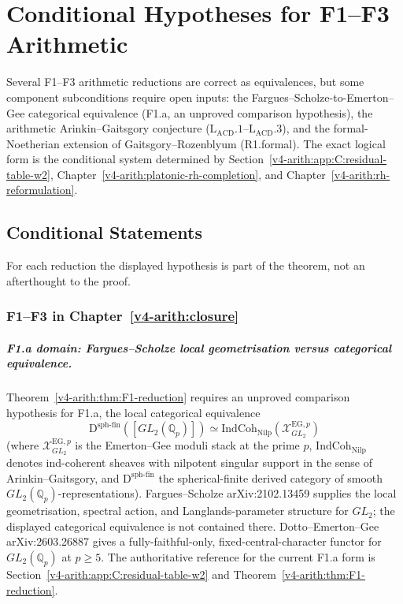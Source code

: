 \chapter{Conditional Hypotheses for F1--F3 Arithmetic}
\label{v4-arith:w3-comparison-A}

Several F1--F3 arithmetic reductions are correct as equivalences, but
some component subconditions require open inputs:
the Fargues--Scholze-to-Emerton--Gee categorical equivalence
(F1.a, an unproved comparison hypothesis), the arithmetic
Arinkin--Gaitsgory conjecture
(\(\mathrm{L}_{\mathrm{ACD}}.1\)--\(\mathrm{L}_{\mathrm{ACD}}.3\)),
and the formal-Noetherian extension of Gaitsgory--Rozenblyum
(R1.formal). The exact logical form is the conditional system
determined by
Section~\ref{v4-arith:app:C:residual-table-w2},
Chapter~\ref{v4-arith:platonic-rh-completion}, and
Chapter~\ref{v4-arith:rh-reformulation}.

\section{Conditional Statements}
\label{v4-arith:w3-comparison-A:list}

For each reduction the displayed hypothesis is part of the theorem, not
an afterthought to the proof.

\subsection{F1--F3 in Chapter~\ref{v4-arith:closure}}
\label{v4-arith:w3-comparison-A:ch22}

\paragraph{F1.a domain: Fargues--Scholze local geometrisation versus categorical equivalence.}
Theorem~\ref{v4-arith:thm:F1-reduction} requires
an unproved comparison hypothesis for F1.a, the local categorical
equivalence
\[
\mathrm{D}^{\mathrm{sph\text{-}fin}}([GL_{2}(\mathbb{Q}_{p})])
\simeq
\mathrm{IndCoh}_{\mathrm{Nilp}}(\mathcal{X}^{\mathrm{EG},p}_{GL_{2}})
\]
(where \(\mathcal{X}^{\mathrm{EG},p}_{GL_2}\) is the
Emerton--Gee moduli stack at the prime \(p\),
\(\mathrm{IndCoh}_{\mathrm{Nilp}}\) denotes ind-coherent sheaves
with nilpotent singular support in the sense of Arinkin--Gaitsgory,
and \(\mathrm{D}^{\mathrm{sph\text{-}fin}}\) the spherical-finite
derived category of smooth \(GL_2(\mathbb{Q}_p)\)-representations).
Fargues--Scholze arXiv:2102.13459 supplies the local geometrisation,
spectral action, and Langlands-parameter structure for \(GL_2\); the
displayed categorical equivalence is not contained there.
Dotto--Emerton--Gee arXiv:2603.26887 gives a fully-faithful-only,
fixed-central-character functor for \(GL_{2}(\mathbb{Q}_{p})\) at
\(p\geq 5\). The authoritative reference for the current F1.a form
is Section~\ref{v4-arith:app:C:residual-table-w2} and
Theorem~\ref{v4-arith:thm:F1-reduction}.

